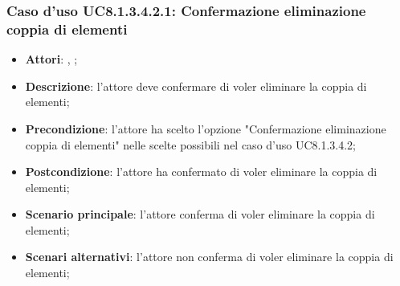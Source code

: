 		\subsubsection{Caso d'uso UC8.1.3.4.2.1: Confermazione eliminazione coppia di elementi}
		\label{UC8.1.3.4.2.1}
		\begin{itemize}
			\item \textbf{Attori}: \uau, \uaupro;
			\item \textbf{Descrizione}: l'attore deve confermare di voler eliminare la coppia di elementi;
			\item \textbf{Precondizione}: l'attore ha scelto l'opzione "Confermazione eliminazione coppia di elementi" nelle scelte possibili nel caso d'uso UC8.1.3.4.2;
			\item \textbf{Postcondizione}: l'attore ha confermato di voler eliminare la coppia di elementi;
			\item \textbf{Scenario principale}: l'attore conferma di voler eliminare la coppia di elementi;
			\item \textbf{Scenari alternativi}: l'attore non conferma di voler eliminare la coppia di elementi; 
		\end{itemize}

